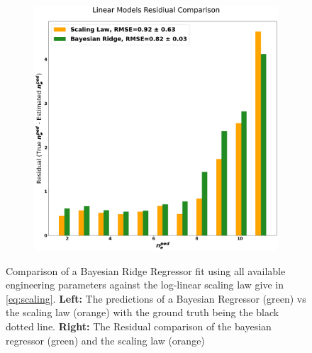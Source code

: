 \documentclass[a4paper, twoside, final, 12pt]{article}
\begin{document}
{\begin{figure}[H]
\begin{subfigure}{0.495\linewidth}
		\includegraphics[scale=0.18]{./src/linear_comp}
	\end{subfigure}\hfill
	\caption{Comparison of a Bayesian Ridge Regressor fit using all available engineering parameters against the log-linear scaling law give in \ref{eq:scaling}. \textbf{Left:} The predictions of a Bayesian Regressor (green) vs the scaling law (orange) with the ground truth being the black dotted line. \textbf{Right:} The Residual comparison of the bayesian regressor (green) and the scaling law (orange) }
	\label{fig:lin_reg}
\end{figure}

}
\end{document}
